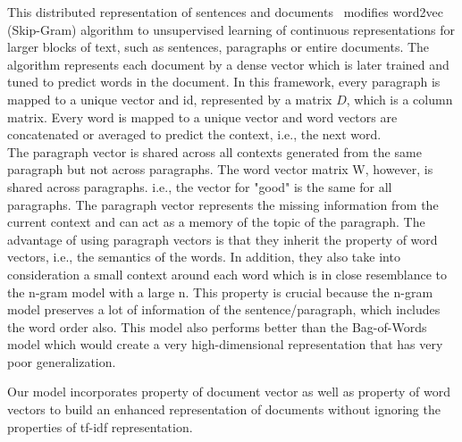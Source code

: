 \documentclass[11pt,a4paper]{article}
\begin{document}
This distributed representation of sentences and documents~\cite{Le:14} modifies word2vec (Skip-Gram) algorithm to unsupervised learning of continuous representations for larger blocks of text, such as sentences, paragraphs or entire documents. The algorithm represents each document by a dense vector which is later trained and tuned to predict words in the document. In this framework, every paragraph is mapped to a unique vector and id, represented by a matrix $D$, which is a column matrix. Every word is mapped to a unique vector and word vectors are concatenated or averaged to predict the context, i.e., the next word.\\
The paragraph vector is shared across all contexts generated from the same paragraph but not across paragraphs. The word vector matrix W, however, is shared across paragraphs. i.e., the vector for "good" is the same for all paragraphs. The paragraph vector represents the missing information from the current context and can act as a memory of the topic of the paragraph. The advantage of using paragraph vectors is that they inherit the property of word vectors, i.e., the semantics of the words. In addition, they also take into consideration a small context around each word which is in close resemblance to the n-gram model with a large n. This property is crucial because the n-gram model preserves a lot of information of the sentence/paragraph, which includes the word order also. This model also performs better than the Bag-of-Words model which would create a very high-dimensional representation that has very poor generalization.

Our model incorporates property of document vector as well as property of word vectors to build an enhanced representation of documents without ignoring the properties of tf-idf representation.

\end{document}
